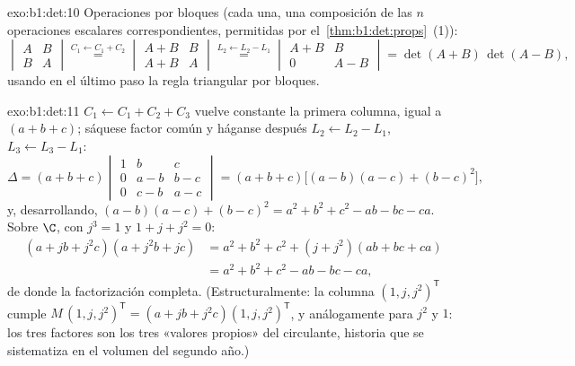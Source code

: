 \begin{solution}{exo:b1:det:10}
Operaciones por bloques (cada una, una composición de las $n$
operaciones escalares correspondientes, permitidas por
el~\cref{thm:b1:det:props}~(1)):
\[
\begin{vmatrix} A & B\\ B & A\end{vmatrix}
\overset{C_1 \leftarrow C_1 + C_2}{=}
\begin{vmatrix} A + B & B\\ A + B & A\end{vmatrix}
\overset{L_2 \leftarrow L_2 - L_1}{=}
\begin{vmatrix} A + B & B\\ 0 & A - B\end{vmatrix}
= \det(A+B)\,\det(A-B),
\]
usando en el último paso la regla triangular por bloques.
\end{solution}

\begin{solution}{exo:b1:det:11}
$C_1 \leftarrow C_1 + C_2 + C_3$ vuelve constante la primera columna,
igual a $(a + b + c)$; sáquese factor común y háganse después
$L_2 \leftarrow L_2 - L_1$, $L_3 \leftarrow L_3 - L_1$:
\[
\Delta = (a+b+c)\begin{vmatrix}
1 & b & c\\
0 & a - b & b - c\\
0 & c - b & a - c
\end{vmatrix}
= (a+b+c)\bigl[(a-b)(a-c) + (b-c)^2\bigr],
\]
y, desarrollando,
$(a-b)(a-c) + (b-c)^2 = a^2 + b^2 + c^2 - ab - bc - ca$. Sobre $\C$,
con $j^3 = 1$ y $1 + j + j^2 = 0$:
\begin{align*}
(a + jb + j^2c)(a + j^2b + jc)
&= a^2 + b^2 + c^2 + (j + j^2)(ab + bc + ca)\\
&= a^2 + b^2 + c^2 - ab - bc - ca ,
\end{align*}
de donde la factorización completa. (Estructuralmente: la columna
$(1, j, j^2)^{\mathsf T}$ cumple
$M\,(1, j, j^2)^{\mathsf T} = (a + jb + j^2c)(1, j,
j^2)^{\mathsf T}$, y análogamente para $j^2$ y $1$: los tres factores
son los tres «valores propios» del circulante, historia que se
sistematiza en el volumen del segundo año.)
\end{solution}

